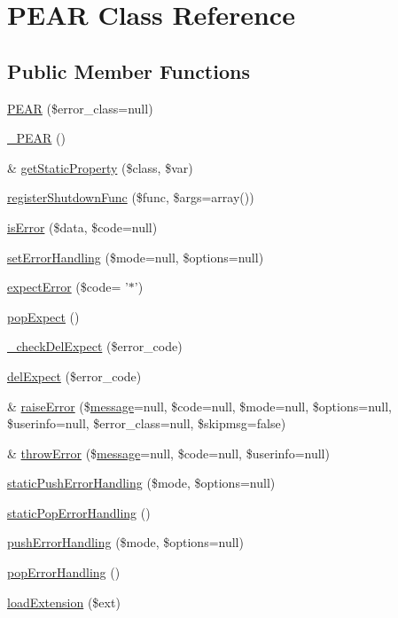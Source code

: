 \hypertarget{classPEAR}{\section{P\-E\-A\-R Class Reference}
\label{classPEAR}
}
\subsection*{Public Member Functions}
\begin{DoxyCompactItemize}
\item 
\hyperlink{classPEAR_a1dc6fd8c04eca33173cc78556178b980}{P\-E\-A\-R} (\$error\-\_\-class=null)
\item 
\hyperlink{classPEAR_a282c57b5152ef70d02b3f08ad826af0a}{\-\_\-\-P\-E\-A\-R} ()
\item 
\& \hyperlink{classPEAR_ac189aee05eb30e8926a952cdf8eb9d02}{get\-Static\-Property} (\$class, \$var)
\item 
\hyperlink{classPEAR_aa2575aa1fe7e5b46b99c35aaa367b04c}{register\-Shutdown\-Func} (\$func, \$args=array())
\item 
\hyperlink{classPEAR_aa2608099ea852b3e982928aab10482ba}{is\-Error} (\$data, \$code=null)
\item 
\hyperlink{classPEAR_abb8e73d9d49ad896205667c412332ffb}{set\-Error\-Handling} (\$mode=null, \$options=null)
\item 
\hyperlink{classPEAR_a57f021082c2e63f78a9f7bfd5b10f14b}{expect\-Error} (\$code= '$\ast$')
\item 
\hyperlink{classPEAR_a3ea2df43e39214a29f77f8773a5afcc4}{pop\-Expect} ()
\item 
\hyperlink{classPEAR_a6350d6f88347be3704dc5967915a7ada}{\-\_\-check\-Del\-Expect} (\$error\-\_\-code)
\item 
\hyperlink{classPEAR_a8aa91fd0c4d61435587519c0417848c5}{del\-Expect} (\$error\-\_\-code)
\item 
\& \hyperlink{classPEAR_add7f8b82b573935527decd2e1af6065d}{raise\-Error} (\$\hyperlink{classmessage}{message}=null, \$code=null, \$mode=null, \$options=null, \$userinfo=null, \$error\-\_\-class=null, \$skipmsg=false)
\item 
\& \hyperlink{classPEAR_a146f08ee812450913835040d43b2c832}{throw\-Error} (\$\hyperlink{classmessage}{message}=null, \$code=null, \$userinfo=null)
\item 
\hyperlink{classPEAR_a5bfc268ba255bb88c2f98bb5f9f0a124}{static\-Push\-Error\-Handling} (\$mode, \$options=null)
\item 
\hyperlink{classPEAR_ad558eaf2cadc1eb2afa180f7a75bcab3}{static\-Pop\-Error\-Handling} ()
\item 
\hyperlink{classPEAR_a44c791bbf9e490da1b053dcd075fd285}{push\-Error\-Handling} (\$mode, \$options=null)
\item 
\hyperlink{classPEAR_adc1bc0e4afb5652ad5c42bbd82b7a353}{pop\-Error\-Handling} ()
\item 
\hyperlink{classPEAR_a0c1ee79fa15f1d8ac1b24686a3d3fe44}{load\-Extension} (\$ext)
\end{DoxyCompactItemize}
